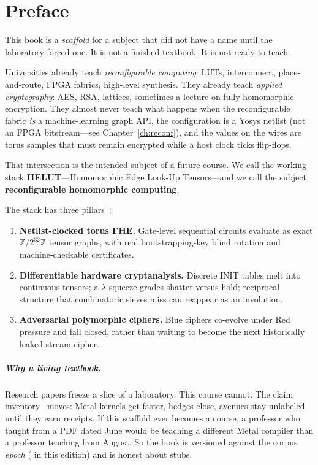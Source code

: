 \chapter{Preface}
\label{ch:preface}

This book is a \emph{scaffold} for a subject that did not have a name
until the laboratory forced one.
It is not a finished textbook. It is not ready to teach.

Universities already teach \emph{reconfigurable computing}: LUTs, interconnect,
place-and-route, FPGA fabrics, high-level synthesis.
They already teach \emph{applied cryptography}: AES, RSA, lattices, sometimes
a lecture on fully homomorphic encryption.
They almost never teach what happens when the reconfigurable fabric \emph{is}
a machine-learning graph API, the configuration is a Yosys netlist (not an FPGA
bitstream---see Chapter~\ref{ch:reconf}), and the values
on the wires are torus samples that must remain encrypted while a host clock
ticks flip-flops.

That intersection is the intended subject of a future course.
We call the working stack \textbf{HELUT}---Homomorphic Edge Look-Up Tensors---and
we call the subject \textbf{reconfigurable homomorphic computing}.

The stack has three pillars~\cite{helut-release,helut-paper}:

\begin{enumerate}
  \item \textbf{Netlist-clocked torus FHE.}
        Gate-level sequential circuits evaluate as exact
        $\mathbb{Z}/2^{32}\mathbb{Z}$ tensor graphs, with real bootstrapping-key
        blind rotation and machine-checkable certificates.
  \item \textbf{Differentiable hardware cryptanalysis.}
        Discrete INIT tables melt into continuous tensors; a $\lambda$-squeeze
        grades shatter versus hold; reciprocal structure that combinatoric
        sieves miss can reappear as an involution.
  \item \textbf{Adversarial polymorphic ciphers.}
        Blue ciphers co-evolve under Red pressure and fail closed, rather than
        waiting to become the next historically leaked stream cipher.
\end{enumerate}

\paragraph{Why a living textbook.}
Research papers freeze a slice of a laboratory.
This course cannot.
The claim inventory~\cite{helut-claim-sheet} moves: Metal kernels get faster,
hedges close, avenues stay unlabeled until they earn receipts.
If this scaffold ever becomes a course, a professor who taught from a PDF
dated June would be teaching a different Metal compiler than a professor
teaching from August.
So the book is versioned against the corpus \emph{epoch}
(\livingepoch{} in this edition) and is honest about stubs.


